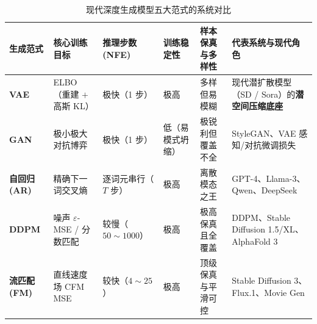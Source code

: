 \begin{table}[htbp]
\centering
\caption{现代深度生成模型五大范式的系统对比}
\label{tab:gen-comparison}
{\footnotesize
\begin{tabularx}{\linewidth}{@{}p{21mm}p{29mm}p{17mm}p{18mm}p{20mm}X@{}}
\toprule
\textbf{生成范式} & \textbf{核心训练目标} & \textbf{推理步数 (NFE)} & \textbf{训练稳定性} & \textbf{样本保真与多样性} & \textbf{代表系统与现代角色} \\
\midrule
\textbf{VAE} & ELBO（重建 $+$ 高斯 KL） & 极快（1 步） & 极高 & 多样但易模糊 & 现代潜扩散模型（SD / Sora）的\textbf{潜空间压缩底座} \\
\textbf{GAN} & 极小极大对抗博弈 & 极快（1 步） & 低（易模式坍缩） & 极锐利但覆盖不全 & StyleGAN、VAE 感知/对抗微调损失 \\
\textbf{自回归 (AR)} & 精确下一词交叉熵 & 逐词元串行（$T$ 步） & 极高 & 离散模态之王 & GPT-4、Llama-3、Qwen、DeepSeek \\
\textbf{DDPM} & 噪声 $\varepsilon$-MSE / 分数匹配 & 较慢（$50\sim 1000$） & 极高 & 极高保真且全覆盖 & DDPM、Stable Diffusion 1.5/XL、AlphaFold 3 \\
\textbf{流匹配 (FM)} & 直线速度场 CFM MSE & 较快（$4\sim 25$） & 极高 & 顶级保真与平滑可控 & Stable Diffusion 3、Flux.1、Movie Gen \\
\bottomrule
\end{tabularx}}
\end{table}

